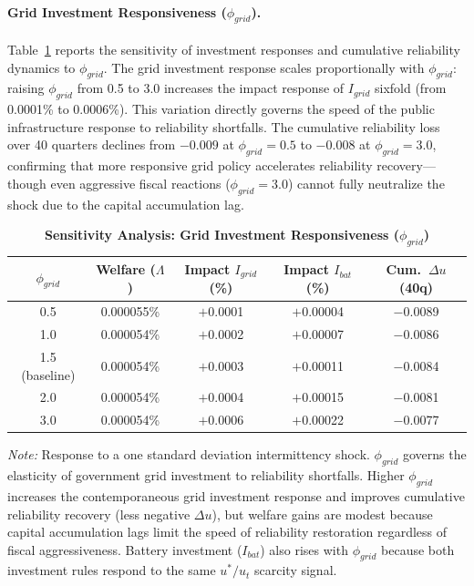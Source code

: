 \documentclass[12pt, a4paper]{article}
\begin{document}
\paragraph{Grid Investment Responsiveness ($\phi_{grid}$).} Table~\ref{tab:phi_grid_sensitivity} reports the sensitivity of investment responses and cumulative reliability dynamics to $\phi_{grid}$. The grid investment response scales proportionally with $\phi_{grid}$: raising $\phi_{grid}$ from 0.5 to 3.0 increases the impact response of $I_{grid}$ sixfold (from 0.0001\% to 0.0006\%). This variation directly governs the speed of the public infrastructure response to reliability shortfalls. The cumulative reliability loss over 40 quarters declines from $-0.009$ at $\phi_{grid} = 0.5$ to $-0.008$ at $\phi_{grid} = 3.0$, confirming that more responsive grid policy accelerates reliability recovery---though even aggressive fiscal reactions ($\phi_{grid} = 3.0$) cannot fully neutralize the shock due to the capital accumulation lag.

\begin{table}[H]
    \centering
    \caption{\textbf{Sensitivity Analysis: Grid Investment Responsiveness ($\phi_{grid}$)}}
    \label{tab:phi_grid_sensitivity}
    \renewcommand{\arraystretch}{1.3}
    \small
    \begin{tabular}{c c c c c}
        \toprule
        $\phi_{grid}$ & \textbf{Welfare ($\Lambda$)} & \textbf{Impact $I_{grid}$ (\%)} & \textbf{Impact $I_{bat}$ (\%)} & \textbf{Cum.\ $\Delta u$ (40q)} \\
        \midrule
        0.5 & 0.000055\% & $+$0.0001 & $+$0.00004 & $-$0.0089 \\
        1.0 & 0.000054\% & $+$0.0002 & $+$0.00007 & $-$0.0086 \\
        1.5 (baseline) & 0.000054\% & $+$0.0003 & $+$0.00011 & $-$0.0084 \\
        2.0 & 0.000054\% & $+$0.0004 & $+$0.00015 & $-$0.0081 \\
        3.0 & 0.000054\% & $+$0.0006 & $+$0.00022 & $-$0.0077 \\
        \bottomrule
    \end{tabular}
    \vspace{0.2cm}
    \parbox{\textwidth}{\footnotesize \textit{Note:} Response to a one standard deviation intermittency shock. $\phi_{grid}$ governs the elasticity of government grid investment to reliability shortfalls. Higher $\phi_{grid}$ increases the contemporaneous grid investment response and improves cumulative reliability recovery (less negative $\Delta u$), but welfare gains are modest because capital accumulation lags limit the speed of reliability restoration regardless of fiscal aggressiveness. Battery investment ($I_{bat}$) also rises with $\phi_{grid}$ because both investment rules respond to the same $u^*/u_t$ scarcity signal.}
\end{table}
\end{document}
